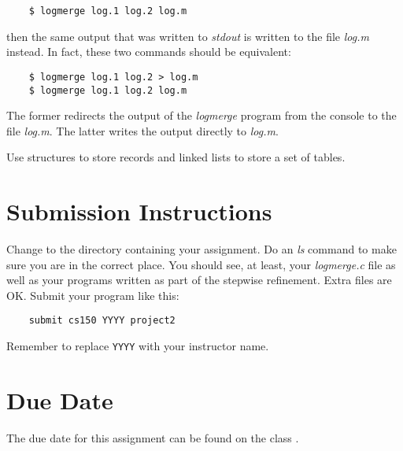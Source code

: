 \documentclass{article}
\begin{document}
\begin{verbatim}
    $ logmerge log.1 log.2 log.m
\end{verbatim}

then the same output that was written to {\it stdout}
is written to the file {\it log.m} instead.
In fact, these two commands should be equivalent:

\begin{verbatim}
    $ logmerge log.1 log.2 > log.m
    $ logmerge log.1 log.2 log.m
\end{verbatim}

The former redirects the output of the {\it logmerge} program from the
console to the file {\it log.m}. The latter writes the output directly
to {\it log.m}.

Use structures to store records and linked lists to store a set of
tables.

\section*{Submission Instructions}

Change to the directory containing your assignment.  Do an
{\it ls} command to make sure you are in the correct place.
You should see, at least, your {\it logmerge.c} file as well
as your programs written as part of the stepwise refinement.
Extra files are OK. Submit your program like this:

\begin{verbatim}
    submit cs150 YYYY project2
\end{verbatim}

Remember to replace \verb!YYYY! with your instructor name.

\section*{Due Date}

The due date for this assignment can be found on the class
.
\end{document}
